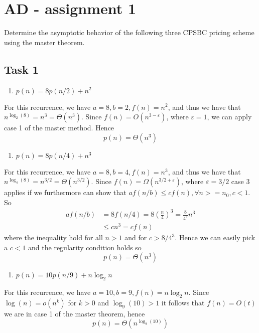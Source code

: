 \documentclass{report}
\begin{document}
\section*{AD - assignment 1}
Determine the asymptotic behavior of the following three CPSBC pricing scheme using the master theorem.%
\subsection*{Task 1}
\begin{enumerate}
	\item $p(n) = 8 p(n/2) +n^2$
\end{enumerate}
For this recurrence, we have $a = 8, b = 2, f(n) = n^2$, and thus we have that $n^{\log_2(8)} = n^3 = \Theta(n^3)$. Since $f(n) = O(n^{3-\varepsilon})$, where $\varepsilon = 1$, we can apply case 1 of the master method. Hence 
$$
p(n) = \Theta(n^3)
$$
%
\begin{enumerate}[resume]
	\item $p(n) = 8 p(n/4) +n^3$
\end{enumerate}
For this recurrence, we have $a = 8, b = 4, f(n) = n^3$, and thus we have that $n^{\log_4(8)} = n^{3/2} = \Theta(n^{3/2})$. Since $f(n) = \Omega(n^{3/2 + \varepsilon})$, where $\varepsilon = 3/2$ case 3 applies if we furthermore can show that $a f(n/b) \leq c f(n), \forall n>=n_0, c<1$. So
\begin{align*}
af(n/b) &= 8f(n/4) = 8\left(\frac{n}{4}\right)^3 = \frac{8}{4^3}n^3\\
				&\leq cn^3 = cf(n)
\end{align*}
where the inequality hold for all $n>1$ and for $c > 8/4^3$. Hence we can easily pick a $c<1$ and the regularity condition holds so
$$
p(n) = \Theta(n^3)
$$
\begin{enumerate}[resume]
	\item $p(n) = 10 p(n/9) +n\log_2n$
\end{enumerate}
For this recurrence, we have $a = 10, b = 9, f(n) = n\log_2n$. Since $\log(n) = o(n^k)$ for $k>0$ and $\log_9(10)>1$ it follows that $f(n) = O(t)$ we are in case 1 of the master theorem, hence 
$$
p(n) = \Theta(n^{\log_9(10)})
$$
\end{document}
